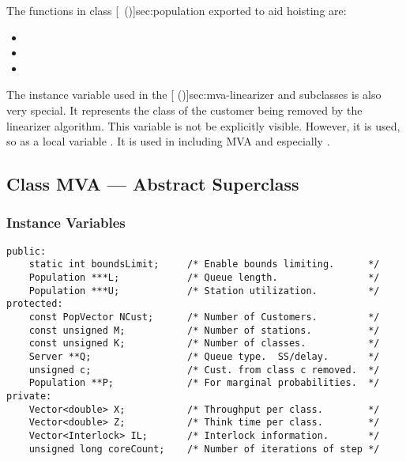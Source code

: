 The functions in class
[~(\Sec\Ref)]{sec:population} exported to aid
hoisting are:
\begin{itemize}
\item {}
\item {}
\item {}
\end{itemize}

The instance variable  used in the
[ (\Sec\Ref)]{sec:mva-linearizer} and subclasses
is also very special.  It represents the class of the customer being
removed by the linearizer algorithm.  This variable is not be
explicitly visible.  However, it is used, so  
as a local variable .  It is used in 
including MVA and especially .

\subsection{Class MVA --- Abstract Superclass}

\subsubsection{Instance Variables}
\label{sec:mva-ivars}

\begin{verbatim}
public:
    static int boundsLimit;     /* Enable bounds limiting.      */
    Population ***L;            /* Queue length.                */
    Population ***U;            /* Station utilization.         */
protected:
    const PopVector NCust;      /* Number of Customers.         */
    const unsigned M;           /* Number of stations.          */
    const unsigned K;           /* Number of classes.           */
    Server **Q;                 /* Queue type.  SS/delay.       */
    unsigned c;                 /* Cust. from class c removed.  */
    Population **P;             /* For marginal probabilities.  */
private:
    Vector<double> X;           /* Throughput per class.        */
    Vector<double> Z;           /* Think time per class.        */
    Vector<Interlock> IL;       /* Interlock information.       */
    unsigned long coreCount;    /* Number of iterations of step */
\end{verbatim}


